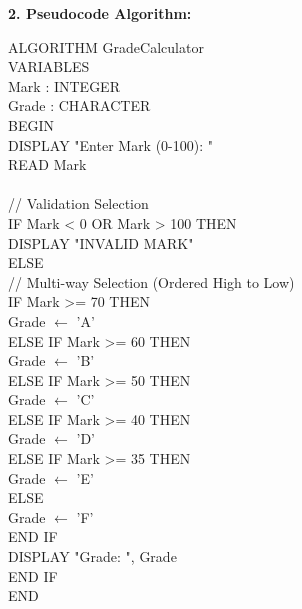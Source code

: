 \documentclass[11pt]{article}
\begin{document}
\begin{exoresolu}
\noindent\textbf{2. Pseudocode Algorithm:}
\begin{flushleft}
\ttfamily\small
ALGORITHM GradeCalculator\\
VARIABLES\\
\hspace{1em}Mark : INTEGER\\
\hspace{1em}Grade : CHARACTER\\
BEGIN\\
\hspace{1em}DISPLAY "Enter Mark (0-100): "\ \\
\hspace{1em}READ Mark\\
\mbox{}\\
\hspace{1em}// Validation Selection\\
\hspace{1em}IF Mark < 0 OR Mark > 100 THEN\\
\hspace{2em}DISPLAY "INVALID MARK"\\
\hspace{1em}ELSE\\
\hspace{2em}// Multi-way Selection (Ordered High to Low)\\
\hspace{2em}IF Mark >= 70 THEN\\
\hspace{3em}Grade $\leftarrow$ 'A'\\
\hspace{2em}ELSE IF Mark >= 60 THEN\\
\hspace{3em}Grade $\leftarrow$ 'B'\\
\hspace{2em}ELSE IF Mark >= 50 THEN\\
\hspace{3em}Grade $\leftarrow$ 'C'\\
\hspace{2em}ELSE IF Mark >= 40 THEN\\
\hspace{3em}Grade $\leftarrow$ 'D'\\
\hspace{2em}ELSE IF Mark >= 35 THEN\\
\hspace{3em}Grade $\leftarrow$ 'E'\\
\hspace{2em}ELSE\\
\hspace{3em}Grade $\leftarrow$ 'F'\\
\hspace{2em}END IF\\
\hspace{2em}DISPLAY "Grade: ", Grade\\
\hspace{1em}END IF\\
END
\end{flushleft}


\end{exoresolu}
\end{document}
